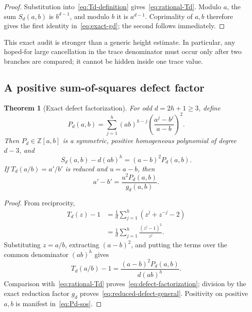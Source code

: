 \documentclass[11pt,oneside]{article}
\newtheorem{theorem}{Theorem}[section]
\theoremstyle{definition}
\theoremstyle{remark}
\newcommand{\Z}{\mathbb Z}
\begin{document}
\begin{proof}
Substitution into~\eqref{eq:Td-definition} gives~\eqref{eq:rational-Td}.  Modulo \(a\), the
sum \(S_d(a,b)\) is \(b^{d-1}\), and modulo \(b\) it is \(a^{d-1}\).  Coprimality of
\(a,b\) therefore gives the first identity in~\eqref{eq:exact-gd}; the second follows
immediately.
\end{proof}

This exact audit is stronger than a generic height estimate.  In particular, any hoped-for
large cancellation in the trace denominator must occur only after two branches are compared;
it cannot be hidden inside one trace value.

\subsection{A positive sum-of-squares defect factor}

\begin{theorem}[Exact defect factorization]
\label{thm:defect-factorization}
For odd \(d=2h+1\ge3\), define
\begin{equation}
 P_d(a,b)=\sum_{j=1}^{h}(ab)^{h-j}
 \left(\frac{a^j-b^j}{a-b}\right)^2.
 \label{eq:Pd-sos}
\end{equation}
Then \(P_d\in\Z[a,b]\) is a symmetric, positive homogeneous polynomial of degree \(d-3\),
and
\begin{equation}
 \boxed{
 S_d(a,b)-d(ab)^h=(a-b)^2P_d(a,b).}
 \label{eq:defect-factorization}
\end{equation}
If \(T_d(a/b)=a'/b'\) is reduced and \(u=a-b\), then
\begin{equation}
 a'-b'=\frac{u^2P_d(a,b)}{g_d(a,b)}.
 \label{eq:reduced-defect-general}
\end{equation}
\end{theorem}

\begin{proof}
From reciprocity,
\begin{align*}
 T_d(z)-1
 &=\frac1d\sum_{j=1}^{h}(z^j+z^{-j}-2)\\
 &=\frac1d\sum_{j=1}^{h}\frac{(z^j-1)^2}{z^j}.
\end{align*}
Substituting \(z=a/b\), extracting \((a-b)^2\), and putting the terms over the common
denominator \((ab)^h\) gives
\[
 T_d(a/b)-1=\frac{(a-b)^2P_d(a,b)}{d(ab)^h}.
\]
Comparison with~\eqref{eq:rational-Td} proves~\eqref{eq:defect-factorization}; division by
the exact reduction factor \(g_d\) proves~\eqref{eq:reduced-defect-general}.  Positivity on
positive \(a,b\) is manifest in~\eqref{eq:Pd-sos}.
\end{proof}
\end{document}
